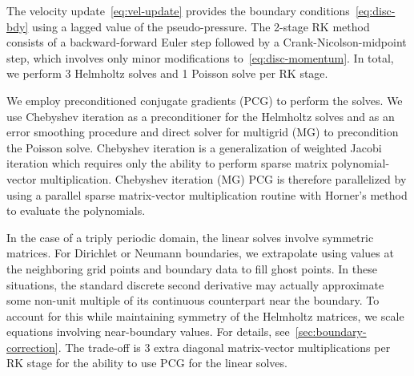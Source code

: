 The velocity update~\eqref{eq:vel-update} provides the boundary conditions~\eqref{eq:disc-bdy} using a lagged
value of the pseudo-pressure. The 2-stage RK method consists of a backward-forward Euler step followed by a
Crank-Nicolson-midpoint step, which involves only minor modifications to~\eqref{eq:disc-momentum}. In total, we
perform 3 Helmholtz solves and 1 Poisson solve per RK stage.

We employ preconditioned conjugate gradients (PCG) to perform the solves. We use Chebyshev iteration as a
preconditioner for the Helmholtz solves and as an error smoothing procedure and direct solver for multigrid (MG)
to precondition the Poisson solve. Chebyshev iteration is a generalization of weighted Jacobi iteration which
requires only the ability to perform sparse matrix polynomial-vector multiplication. Chebyshev iteration (MG) PCG
is therefore parallelized by using a parallel sparse matrix-vector multiplication routine with Horner's method to
evaluate the polynomials.

In the case of a triply periodic domain, the linear solves involve symmetric matrices. For Dirichlet or Neumann
boundaries, we extrapolate using values at the neighboring grid points and boundary data to fill ghost points. In
these situations, the standard discrete second derivative may actually approximate some non-unit multiple of its
continuous counterpart near the boundary. To account for this while maintaining symmetry of the Helmholtz
matrices, we scale equations involving near-boundary values. For details, see~\ref{sec:boundary-correction}. The
trade-off is 3 extra diagonal matrix-vector multiplications per RK stage for the ability to use PCG for the linear
solves.
